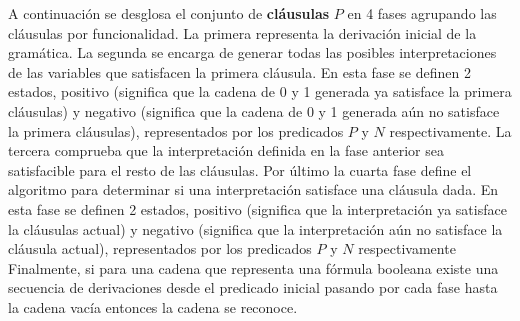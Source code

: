 \documentclass[12pt]{article}
\begin{document}
A continuación se desglosa el conjunto de \textbf{cláusulas} $P$ en 4 fases agrupando las cláusulas por funcionalidad.
La primera representa la derivación inicial de la gramática. La segunda se encarga de generar todas las posibles interpretaciones
de las variables que satisfacen la primera cláusula. En esta fase se definen 2 estados, positivo (significa
que la cadena de 0 y 1 generada ya satisface la primera cláusulas) y negativo (significa que la cadena de 0 y 1 
generada aún no satisface la primera cláusulas), representados por los predicados $P$ y $N$ respectivamente. 
La tercera comprueba que la interpretación definida en la fase anterior sea satisfacible para el resto de las 
cláusulas. Por último la cuarta fase define el algoritmo para determinar si una interpretación satisface una 
cláusula dada. En esta fase se definen 2 estados, positivo (significa que la interpretación ya satisface la cláusulas actual) 
y negativo (significa que la interpretación aún no satisface la cláusula actual), representados por los predicados $P$ y $N$ respectivamente  Finalmente, si para una cadena que representa una fórmula booleana existe una secuencia de 
derivaciones desde el predicado inicial pasando por cada fase hasta la cadena vacía entonces la cadena se 
reconoce.
\end{document}

